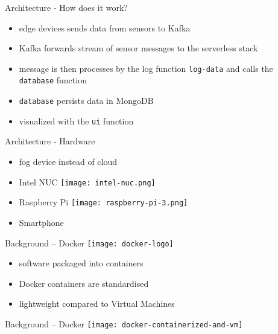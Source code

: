 \documentclass[aspectratio=169]{beamer}
\begin{document}
  \begin{frame}{Architecture - How does it work?}
    \begin{itemize}
      \item edge devices sends data from sensors to Kafka
      \item Kafka forwards stream of sensor messages to the serverless stack
      \item message is then processes by the log function \lstinline{log-data} and calls the \lstinline{database} function
      \item \lstinline{database} persists data in MongoDB
      \item visualized with the \lstinline{ui} function
    \end{itemize}
  \end{frame}

  \begin{frame}{Architecture - Hardware}
    \begin{itemize}
      \item fog device instead of cloud
      \item Intel NUC
            \hspace*{13.5em}
            \texttt{[image: intel-nuc.png]}
      \item Raspberry Pi
            \hspace*{13.5em}
            \texttt{[image: raspberry-pi-3.png]}
      \item Smartphone
    \end{itemize}
  \end{frame}

  \begin{frame}{Background -- Docker}
    \texttt{[image: docker-logo]}

    \vspace*{1.5em}

    \begin{itemize}
      \item software packaged into containers
      \item Docker containers are standardised
      \item lightweight compared to Virtual Machines
    \end{itemize}
  \end{frame}

  \begin{frame}{Background -- Docker}
    \vfill
    \texttt{[image: docker-containerized-and-vm]}
  \end{frame}
\end{document}
